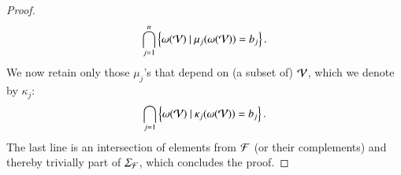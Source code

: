 {\begin{proof}
\begin{align}
    \bigcap_{j=1}^n
    \left\{
    \omega(\mathcal{V})
        ~|~
        \mu_j(\omega(\mathcal{V}))={b_j}       
    \right\}.
\end{align}
We now retain only those $ \mu_j$'s that depend on (a subset of) $\mathcal{V}$, which we denote by $ \kappa_j$:
\begin{align}
    \bigcap_{j=1}
    \left\{
        \omega(\mathcal{V})
            ~|~
            \kappa_j(\omega(\mathcal{V}))={b_j}      
        \right\}.
\end{align}
The last line is an intersection of elements from $\mathcal{F}$ (or their complements) and thereby trivially part of $ \Sigma_\mathcal{F}$, which concludes the proof.
\end{proof}

}
